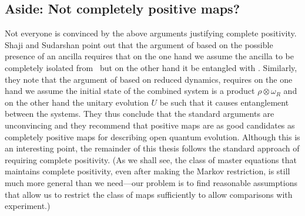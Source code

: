 \subsection{Aside: Not completely positive maps?}
Not everyone is convinced by the above arguments justifying complete positivity. Shaji and Sudarshan \cite{shaji_2005} point out that the argument of  based on the possible presence of an ancilla requires that on the one hand we assume the ancilla to be completely isolated from \SSS\ but on the other hand it be entangled with \SSS\@. Similarly, they note that the argument of  based on reduced dynamics, requires on the one hand we assume the initial state of the combined system is a product $\rho\otimes\omega_R$ and on the other hand the unitary evolution $U$ be such that it causes entanglement between the systems. They thus conclude that the standard arguments are unconvincing and they recommend that positive maps are as good candidates as completely positive maps for describing open quantum evolution. Although this is an interesting point, the remainder of this thesis follows the standard approach of requiring complete positivity. (As we shall see, the class of master equations that maintains complete positivity, even after making the Markov restriction, is still much more general than we need---our problem is to find reasonable assumptions that allow us to restrict the class of maps sufficiently to allow comparisons with experiment.)

